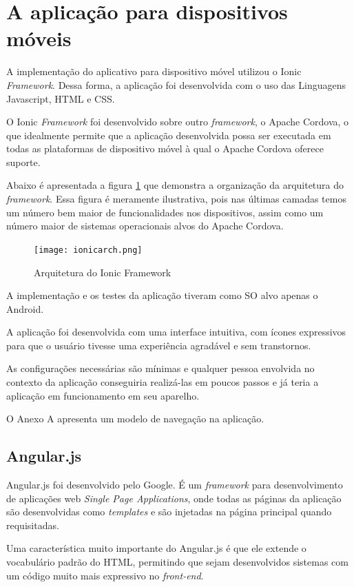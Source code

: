 \section{A aplicação para dispositivos móveis}
A implementação do aplicativo para dispositivo móvel utilizou o Ionic \textit{Framework}. Dessa forma, a aplicação foi desenvolvida com o uso das Linguagens Javascript, HTML e CSS.

O Ionic \textit{Framework} foi desenvolvido sobre outro \textit{framework}, o Apache Cordova, o que idealmente permite que a aplicação desenvolvida possa ser executada em todas as plataformas de dispositivo móvel à qual o Apache Cordova oferece suporte.

Abaixo é apresentada a figura \ref{fig:ionicarch} que demonstra a organização da arquitetura do \textit{framework}. Essa figura é meramente ilustrativa, pois nas últimas camadas temos um número bem maior de funcionalidades nos dispositivos, assim como um número maior de sistemas operacionais alvos do Apache Cordova.

\begin{figure}[!htb]
  \centering
  \texttt{[image: ionicarch.png]} %
  \caption[Arquitetura do Ionic Framework]{Arquitetura do Ionic Framework}
  \label{fig:ionicarch}
\end{figure}

A implementação e os testes da aplicação tiveram como SO alvo apenas o Android.

A aplicação foi desenvolvida com uma interface intuitiva, com ícones expressivos para que o usuário tivesse uma experiência agradável e sem transtornos.

As configurações necessárias são mínimas e qualquer pessoa envolvida no contexto da aplicação conseguiria realizá-las em poucos passos e já teria a aplicação em funcionamento em seu aparelho.

O Anexo A apresenta um modelo de navegação na aplicação.

\subsection{Angular.js}
Angular.js foi desenvolvido pelo Google. É um \textit{framework} para desenvolvimento de aplicações web \textit{Single Page Applications}, onde todas as páginas da aplicação são desenvolvidas como \textit{templates} e são injetadas na página principal quando requisitadas.

Uma característica muito importante do Angular.js é que ele extende o vocabulário padrão do HTML, permitindo que sejam desenvolvidos sistemas com um código muito mais expressivo no \textit{front-end}.

